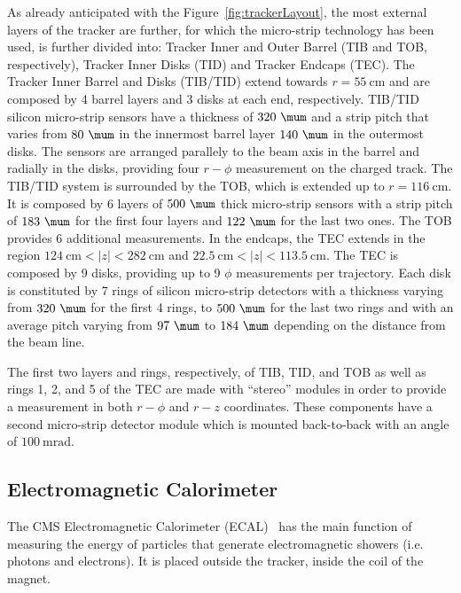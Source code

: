 As already anticipated with the Figure~\ref{fig:trackerLayout}, the most external layers of 
the tracker are further, for which the micro-strip technology has been used, is further divided into: 
Tracker Inner and Outer Barrel (TIB and TOB, respectively), Tracker Inner Disks (TID) and Tracker Endcaps (TEC).
The Tracker Inner Barrel and Disks (TIB/TID) extend towards $r=55~\si{\cm}$ and are composed by 4 barrel
layers and 3 disks at each end, respectively. TIB/TID silicon micro-strip sensors have a thickness
of $320~\si{\mum}$ and a strip pitch that varies from $80~\si{\mum}$ in the innermost barrel layer 
$140~\si{\mum}$ in the outermost disks. The sensors are arranged parallely to the beam axis
in the barrel and radially in the disks, providing four $r-\phi$ measurement on the charged track.
The TIB/TID system is surrounded by the TOB, which is extended up to $r=116~\si{\cm}$. It is
composed by 6 layers of $500~\si{\mum}$ thick micro-strip sensors with a strip pitch 
of $183~\si{\mum}$ for the first four layers and $122~\si{\mum}$ for the last two ones.
The TOB provides 6 additional measurements.
In the endcaps, the TEC extends in the region $124~\si{\cm}<|z|<282~\si{\cm}$ 
and $22.5~\si{\cm} < |z|< 113.5~\si{\cm}$. The TEC is composed by 9 disks, providing up to 9 $\phi$
measurements per trajectory. Each disk is constituted by 7 rings of silicon micro-strip detectors 
with a thickness varying from $320~\si{\mum}$ for the first 4 rings, to $500~\si{\mum}$
for the last two rings and with an average pitch varying from $97~\si{\mum}$ to $184~\si{\mum}$
depending on the distance from the beam line. 

The first two layers and rings, respectively, of TIB, TID, and
TOB as well as rings 1, 2, and 5 of the TEC are made with ``stereo'' modules in 
order to provide a measurement in both $r-\phi$ and $r-z$ coordinates. These components
have a second micro-strip detector module which is mounted back-to-back with an angle of $100~\si{\milli\radian}$.

\subsection{Electromagnetic Calorimeter}
\label{subsec:ecalo}

The CMS Electromagnetic Calorimeter (ECAL)~\cite{ecalTDR} has the main function of measuring
the energy of particles that generate electromagnetic showers (i.e. photons and electrons).
It is placed outside the tracker, inside the coil of the magnet. 

